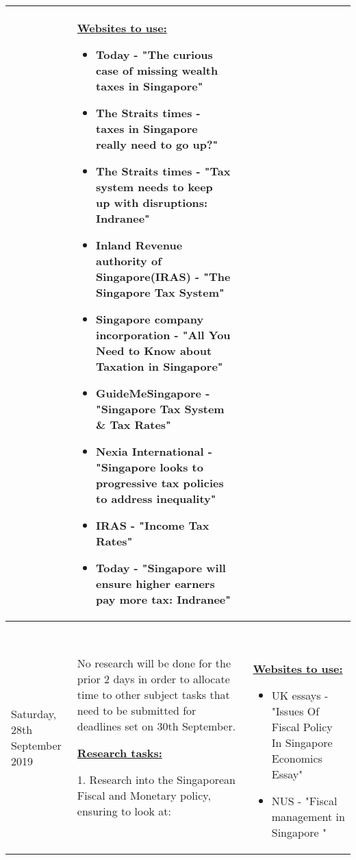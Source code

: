 \documentclass[12pt, a4paper]{article}
\newlength\combinedlength
\begin{document}
\begin{landscape}
\begin{longtable}{|m{5cm}|m{5cm}|m{5cm}|m{10.31cm}|}
{				
			}&
		
			\textbf{\underline{Websites to use:}}
			\newline
			
			\begin{itemize}
				\item Today - "The curious case of missing wealth taxes in Singapore"
				\item The Straits times - taxes in Singapore really need to go up?"
				\item The Straits times - "Tax system needs to keep up with disruptions: Indranee"
				\item Inland Revenue authority of Singapore(IRAS) - "The Singapore Tax System"
				\item Singapore company incorporation - "All You Need to Know about Taxation in Singapore"
				\item GuideMeSingapore - "Singapore Tax System \& Tax Rates"
				\item Nexia International - "Singapore looks to progressive tax policies to address inequality"
				\item IRAS - "Income Tax Rates"
				\item Today - "Singapore will ensure higher earners pay more tax: Indranee"
			\end{itemize}
		
			\\
			\hline
			
			Saturday, 28th September 2019 & \multicolumn{2}{|m{\combinedlength}|}{	
				
				No research will be done for the prior 2 days in order to allocate time to other subject tasks that need to be submitted for deadlines set on 30th September.
				\newline
				
				\textbf{\underline{Research tasks:}}
				\newline
				
				1. Research into the Singaporean Fiscal and Monetary policy, ensuring to look at:
		
			}&\
		
			\textbf{\underline{Websites to use:}}
		\newline
		
		\begin{itemize}
			\item UK essays - "Issues Of Fiscal Policy In Singapore Economics Essay"
			\item NUS - "Fiscal management in Singapore "
		\end{itemize}\\
		\hline
		

\end{longtable}
\end{landscape}
\end{document}
